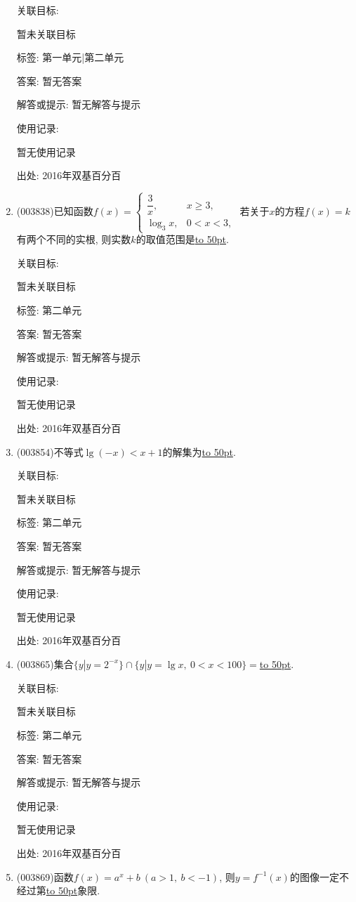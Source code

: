 \documentclass[10pt,a4paper]{article}
\newcommand{\blank}[1]{\underline{\hbox to #1pt{}}}
\begin{document}
\begin{enumerate}[1.]
关联目标:

暂未关联目标



标签: 第一单元|第二单元

答案: 暂无答案

解答或提示: 暂无解答与提示

使用记录:

暂无使用记录


出处: 2016年双基百分百
\item { (003838)}已知函数$f(x)=\begin{cases}
\dfrac 3x, & x\ge 3,\\ \log_3 x, & 0<x<3,
\end{cases}$ 若关于$x$的方程$f(x)=k$有两个不同的实根, 则实数$k$的取值范围是\blank{50}.


关联目标:

暂未关联目标



标签: 第二单元

答案: 暂无答案

解答或提示: 暂无解答与提示

使用记录:

暂无使用记录


出处: 2016年双基百分百
\item { (003854)}不等式$\lg(-x)<x+1$的解集为\blank{50}.


关联目标:

暂未关联目标



标签: 第二单元

答案: 暂无答案

解答或提示: 暂无解答与提示

使用记录:

暂无使用记录


出处: 2016年双基百分百
\item { (003865)}集合$\{y|y=2^{-x}\}\cap\{y|y=\lg x, \ 0<x<100\}=$\blank{50}.


关联目标:

暂未关联目标



标签: 第二单元

答案: 暂无答案

解答或提示: 暂无解答与提示

使用记录:

暂无使用记录


出处: 2016年双基百分百
\item { (003869)}函数$f(x)=a^x+b \ (a>1, \ b<-1)$, 则$y=f^{-1}(x)$的图像一定不经过第\blank{50}象限.



\end{enumerate}
\end{document}
